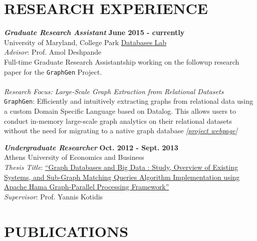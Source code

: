 \documentclass[margin, 10pt]{res} %
\begin{document}
\begin{resume}

\section{RESEARCH EXPERIENCE}

{\sl \textbf{Graduate Research Assistant}} \hfill \textbf{June 2015 - currently} \\
University of Maryland, College Park \href{http://www.cs.umd.edu/~amol/DBGroup/pubs.html}{Databases Lab}\\
\textit{Advisor}: Prof. Amol Deshpande\\
Full-time Graduate Research Assistantship working on the followup research paper
for the \texttt{GraphGen} Project.\\
\\
{\sl \textit{Research Focus}: Large-Scale Graph Extraction from Relational Datasets}\\
   \texttt{GraphGen}: Efficiently and intuitively extracting graphs from relational data using a custom Domain Specific Language based on Datalog. This allows users to conduct in-memory large-scale graph analytics on their relational datasets without the need for migrating to a native graph database \textit{[\href{http://konstantinosx.github.io/graphgen-project/}{project webpage}]}

{\sl \textbf{Undergraduate Researcher}} \hfill \textbf{Oct. 2012 - Sept. 2013}\\
Athens University of Economics and Business\\
\textit{Thesis Title}:
\href{https://drive.google.com/open?id=0B20MIwp_I7FlVFlNVWtQb3VXTmM}{``Graph Databases and Big Data : Study, Overview of Existing Systems, and Sub-Graph Matching Queries Algorithm Implementation using Apache Hama Graph-Parallel Processing Framework''}\\
\textit{Supervisor}: Prof. Yannis Kotidis


\section{PUBLICATIONS }


\end{resume}
\end{document}
